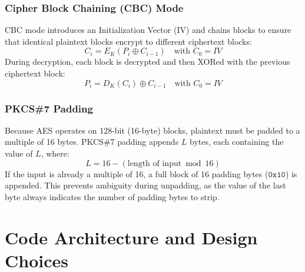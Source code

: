 \documentclass[11pt,a4paper]{article}
\begin{document}
\subsubsection{Cipher Block Chaining (CBC) Mode}
CBC mode introduces an Initialization Vector (IV) and chains blocks to ensure that identical plaintext blocks encrypt to different ciphertext blocks:
\begin{equation}
    C_i = E_K(P_i \oplus C_{i-1}) \quad \text{with } C_0 = IV
\end{equation}
During decryption, each block is decrypted and then XORed with the previous ciphertext block:
\begin{equation}
    P_i = D_K(C_i) \oplus C_{i-1} \quad \text{with } C_0 = IV
\end{equation}

\subsubsection{PKCS\#7 Padding}
Because AES operates on 128-bit (16-byte) blocks, plaintext must be padded to a multiple of 16 bytes.
PKCS\#7 padding appends $L$ bytes, each containing the value of $L$, where:
\begin{equation}
    L = 16 - (\text{length of input} \bmod 16)
\end{equation}
If the input is already a multiple of 16, a full block of 16 padding bytes ($\mathtt{0x10}$) is appended. This prevents ambiguity during unpadding, as the value of the last byte always indicates the number of padding bytes to strip.

\newpage

\section{Code Architecture and Design Choices}
\end{document}
